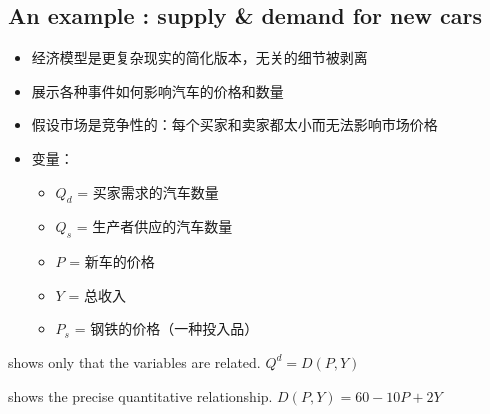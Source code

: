 \subsection{An example : supply \& demand for new cars}
\begin{itemize}
    \item 经济模型是更复杂现实的简化版本，无关的细节被剥离
    \item 展示各种事件如何影响汽车的价格和数量
    \item 假设市场是竞争性的：每个买家和卖家都太小而无法影响市场价格
    \item 变量：
    \begin{itemize}
        \item $Q_d$ = 买家需求的汽车数量
        \item $Q_s$ = 生产者供应的汽车数量
        \item $P$ = 新车的价格
        \item $Y$ = 总收入
        \item $P_s$ = 钢铁的价格（一种投入品）
    \end{itemize}
\end{itemize}

\begin{definition}
    shows only that the variables are related. $Q^d = D(P,Y)$
\end{definition}
\begin{definition}
    shows the precise quantitative relationship. $D(P,Y) = 60-10P+2Y$
\end{definition}

